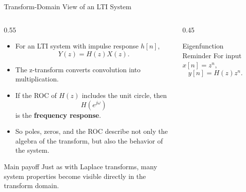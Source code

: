 \begin{frame}[t]{Transform-Domain View of an LTI System}
  \small
  \begin{columns}[T]
    \begin{column}{0.55\textwidth}
      \begin{itemize}
        \item For an LTI system with impulse response $h[n]$,
          \[
            Y(z)=H(z)X(z).
          \]
        \item The z-transform converts convolution into multiplication.
        \item If the ROC of $H(z)$ includes the unit circle, then
          \[
            H(e^{j\omega})
          \]
          is the \textbf{frequency response}.
        \item So poles, zeros, and the ROC describe not only the algebra of the transform, but also the behavior of the system.
      \end{itemize}
      \begin{insightbox}{Main payoff}
        Just as with Laplace transforms, many system properties become visible directly in the transform domain.
      \end{insightbox}
    \end{column}
    \begin{column}{0.45\textwidth}
      \begin{center}
      \end{center}

      \vspace{0.15cm}
      \begin{conceptbox}{Eigenfunction Reminder}
        For input $x[n]=z^n$,
        \[
          y[n]=H(z)z^n.
        \]
      \end{conceptbox}
    \end{column}
  \end{columns}
\end{frame}

